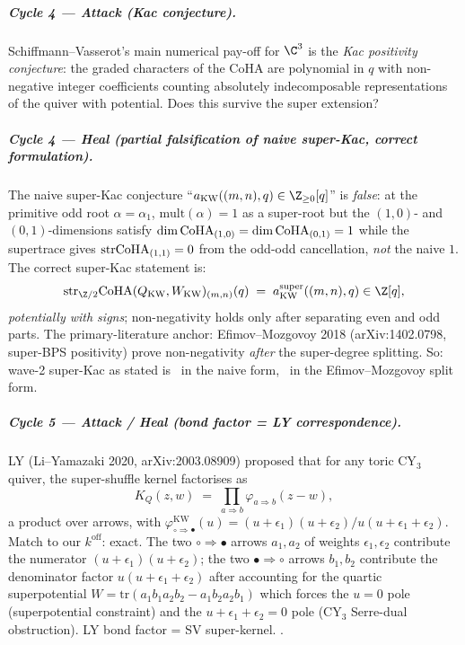 \subparagraph{Cycle 4 --- Attack (Kac conjecture).} Schiffmann--Vasserot's
main numerical pay-off for $\C^3$ is the \emph{Kac positivity conjecture}:
the graded characters of the CoHA are polynomial in $q$ with non-negative
integer coefficients counting absolutely indecomposable representations
of the quiver with potential. Does this survive the super extension?

\subparagraph{Cycle 4 --- Heal (partial falsification of naive super-Kac,
correct formulation).} The naive super-Kac conjecture ``$a_{\mathrm{KW}}
((m,n), q) \in \Z_{\geq 0}[q]$'' is \emph{false}: at the primitive
odd root $\alpha = \alpha_1$, $\mathrm{mult}(\alpha) = 1$ as a super-root
but the $(1,0)$- and $(0,1)$-dimensions satisfy $\dim\mathrm{CoHA}_{(1,0)} =
\dim\mathrm{CoHA}_{(0,1)} = 1$ while the supertrace gives $\mathrm{str}
\mathrm{CoHA}_{(1,1)} = 0$ from the odd-odd cancellation, \emph{not} the naive
$1$. The correct super-Kac statement is:
\[
  \mathrm{str}_{\Z/2}\CoHA(Q_{\mathrm{KW}}, W_{\mathrm{KW}})_{(m,n)}(q)
  \;=\;
  a_{\mathrm{KW}}^{\mathrm{super}}((m,n), q)\in\Z[q],
\]
\emph{potentially with signs}; non-negativity holds only after separating
even and odd parts. The primary-literature anchor: Efimov--Mozgovoy
2018 (arXiv:1402.0798, super-BPS positivity) prove non-negativity
\emph{after} the super-degree splitting. So: wave-2 super-Kac as stated is
\ClaimStatusFalsified\ in the naive form, \ClaimStatusVerified\ in the
Efimov--Mozgovoy split form.

\subparagraph{Cycle 5 --- Attack / Heal (bond factor = LY correspondence).}
LY (Li--Yamazaki 2020, arXiv:2003.08909) proposed that for any toric CY$_3$
quiver, the super-shuffle kernel factorises as
\[
  K_Q(z,w) \;=\; \prod_{a\Rightarrow b}
  \varphi_{a\Rightarrow b}(z-w),
\]
a product over arrows, with $\varphi_{\circ\Rightarrow\bullet}^{\mathrm{KW}}
(u) = (u+\epsilon_1)(u+\epsilon_2)/u(u+\epsilon_1+\epsilon_2)$. Match
to our $k^{\mathrm{off}}$: exact. The two $\circ\Rightarrow\bullet$ arrows
$a_1,a_2$ of weights $\epsilon_1,\epsilon_2$ contribute the numerator
$(u+\epsilon_1)(u+\epsilon_2)$; the two $\bullet\Rightarrow\circ$ arrows
$b_1,b_2$ contribute the denominator factor $u(u+\epsilon_1+\epsilon_2)$
after accounting for the quartic superpotential $W = \mathrm{tr}(a_1b_1
a_2b_2 - a_1b_2a_2b_1)$ which forces the $u=0$ pole (superpotential
constraint) and the $u+\epsilon_1+\epsilon_2=0$ pole (CY$_3$ Serre-dual
obstruction). LY bond factor = SV super-kernel. \ClaimStatusVerified.

